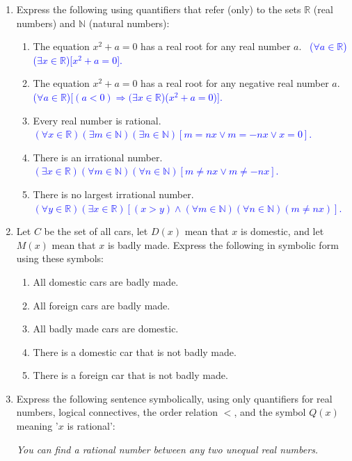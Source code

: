 \documentclass[13.5pt]{article}
\begin{document}
\begin{enumerate}
\item{Express the following using quantifiers that refer (only) to the sets \(\mathbb{R}\) (real numbers) and \(\mathbb{N}\) (natural numbers):}

\begin{enumerate}
\setlength{\itemindent}{.1in}
\item{The equation \(x^2+a=0\) has a real root for any real number \(a\).}\
\textcolor{blue} { (\(\forall a \in \mathbb{R}\))(\(\exists x \in \mathbb{R}\))[\(x^2+a=0\)]. }
\item{The equation \(x^2+a=0\) has a real root for any negative real number \(a\).}\
\textcolor{blue} { (\(\forall a\in \mathbb{R}\))[\((a<0)\Rightarrow(\exists x \in \mathbb{R}\))(\(x^2+a=0\))]. }
\item{Every real number is rational.}\
\textcolor{blue} { \((\forall x\in \mathbb{R})(\exists m \in \mathbb{N})(\exists n \in \mathbb{N})[m=nx \vee m=-nx \vee x=0]\). }
\item{There is an irrational number.}\
\textcolor{blue} { \((\exists x \in \mathbb{R})(\forall m\in \mathbb{N})(\forall n\in \mathbb{N})[m \neq nx \vee m \neq -nx]\). }
\item{There is no largest irrational number.}\
\textcolor{blue} { \((\forall y\in \mathbb{R})(\exists x\in \mathbb{R})[(x>y)\wedge(\forall m\in \mathbb{N})(\forall n\in \mathbb{N})(m \neq nx)]\). }
\end{enumerate}

\item{Let \(C\) be the set of all cars, let \(D(x)\) mean that \(x\) is domestic, and let \(M(x)\) mean that \(x\) is badly made. Express the following in symbolic form using these symbols:}

\begin{enumerate}
\setlength{\itemindent}{.1in}
\item{All domestic cars are badly made.}\
\item{All foreign cars are badly made.}\
\item{All badly made cars are domestic.}\
\item{There is a domestic car that is not badly made.}\
\item{There is a foreign car that is not badly made.}\
\end{enumerate}

\item{Express the following sentence symbolically, using only quantifiers for real numbers, logical connectives, the order relation \(<\), and the symbol \(Q(x)\) meaning '\(x\) is rational': }
\begin{center}
\textit{You can find a rational number between any two unequal real numbers.}
\end{center}


\end{enumerate}
\end{document}
